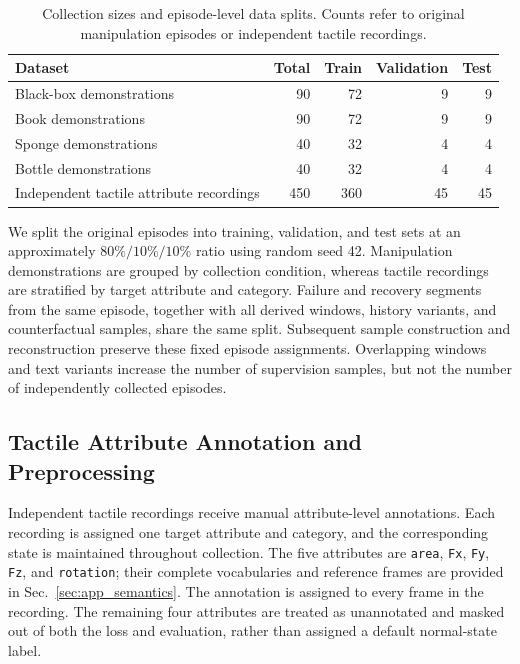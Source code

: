 \begin{table}[t]
\centering
\small
\caption{Collection sizes and episode-level data splits. Counts refer to original manipulation episodes or independent tactile recordings.}
\label{tab:app_data_split}
\setlength{\tabcolsep}{6pt}
\renewcommand{\arraystretch}{1.12}
\begin{tabularx}{\textwidth}{@{}>{\raggedright\arraybackslash}Xrrrr@{}}
\toprule
\textbf{Dataset} & \textbf{Total} & \textbf{Train} & \textbf{Validation} & \textbf{Test} \\
\midrule
Black-box demonstrations & 90 & 72 & 9 & 9 \\
Book demonstrations & 90 & 72 & 9 & 9 \\
Sponge demonstrations & 40 & 32 & 4 & 4 \\
Bottle demonstrations & 40 & 32 & 4 & 4 \\
Independent tactile attribute recordings & 450 & 360 & 45 & 45 \\
\bottomrule
\end{tabularx}
\end{table}

We split the original episodes into training, validation, and test sets at an approximately $80\%/10\%/10\%$ ratio using random seed 42. Manipulation demonstrations are grouped by collection condition, whereas tactile recordings are stratified by target attribute and category. Failure and recovery segments from the same episode, together with all derived windows, history variants, and counterfactual samples, share the same split. Subsequent sample construction and reconstruction preserve these fixed episode assignments. Overlapping windows and text variants increase the number of supervision samples, but not the number of independently collected episodes.

\subsection{Tactile Attribute Annotation and Preprocessing}
\label{sec:app_tactile_annotation}

Independent tactile recordings receive manual attribute-level annotations. Each recording is assigned one target attribute and category, and the corresponding state is maintained throughout collection. The five attributes are \texttt{area}, \texttt{Fx}, \texttt{Fy}, \texttt{Fz}, and \texttt{rotation}; their complete vocabularies and reference frames are provided in Sec.~\ref{sec:app_semantics}. The annotation is assigned to every frame in the recording. The remaining four attributes are treated as unannotated and masked out of both the loss and evaluation, rather than assigned a default normal-state label.

